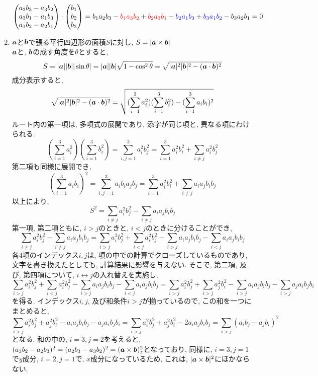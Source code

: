 \documentclass{jsarticle}
\newcommand*{\mbold}[1]{\mbox{\boldmath $#1$}}
\begin{document}
\begin{enumerate}
\[    \]
    \[
      \begin{pmatrix}
        a_2 b_3 - a_3 b_2 \\
        a_3 b_1 - a_1 b_3 \\
        a_1 b_2 - a_2 b_1
      \end{pmatrix}
      \cdot
      \begin{pmatrix}
        b_1 \\
        b_2 \\
        b_3
      \end{pmatrix}
      = b_1 a_2 b_3 - \textcolor{red}{b_1 a_3 b_2}
      + \textcolor{red}{b_2 a_3 b_1} - \textcolor{blue}{b_2 a_1 b_3}
      + \textcolor{blue}{b_3 a_1 b_2} - b_3 a_2 b_1 = 0 
    \]
  \item $\mbold{a}$と$\mbold{b}$で張る平行四辺形の面積$S$に対し, $S = |\mbold{a} \times \mbold{b}|$ \\
    $\mbold{a}$と, $\mbold{b}$の成す角度を$\theta$とすると, 
    \[
      S = |\mbold{a}||\mbold{b}||\sin\theta|
      = |\mbold{a}||\mbold{b}|\sqrt{1 - \cos^2\theta}
      = \sqrt{|\mbold{a}|^2 |\mbold{b}|^2 - (\mbold{a}\cdot\mbold{b})^2}
    \]
    成分表示すると, 
    \[
      \sqrt{|\mbold{a}|^2 |\mbold{b}|^2 - (\mbold{a}\cdot\mbold{b})^2}
      = \sqrt{(\sum_{i = 1}^{3} a_i^2) (\sum_{i = 1}^{3} b_i^2) - (\sum_{i = 1}^{3} a_i b_i)^2}
    \]
    ルート内の第一項は, 多項式の展開であり, 添字が同じ項と, 異なる項にわけられる. 
    \[
      (\sum_{i = 1}^{3} a_i^2) (\sum_{i = 1}^{3} b_i^2) = \sum_{i,j=1}^{3}a_i^2 b_j^2 = \sum_{i = 1}^{3}a_i^2 b_i^2 + \sum_{i \neq j}a_i^2 b_j^2
    \]
    第二項も同様に展開でき, 
    \[
      (\sum_{i = 1}^{3} a_i b_i)^2 = \sum_{i,j = 1}^{3}a_i b_i a_j b_j = \sum_{i = 1}^{3}a_i^2 b_i^2 + \sum_{i\neq j}a_i a_j b_i b_j
    \]
    以上により, 
    \[
      S^2 = \sum_{i \neq j}a_i^2 b_j^2 - \sum_{i \neq j}a_i a_j b_i b_j
    \]
    第一項, 第二項ともに, $i > j$のときと, $i < j$のときに分けることができ, 
    \[
      \sum_{i \neq j}a_i^2 b_j^2 - \sum_{i \neq j}a_i a_j b_i b_j
      = \sum_{i > j}a_i^2 b_j^2 + \sum_{i < j}a_i^2 b_j^2 - \sum_{i > j}a_i a_j b_i b_j - \sum_{i < j}a_i a_j b_i b_j
    \]
    各4項のインデックス$i, j$は, 項の中での計算でクローズしているものであり, 文字を書き換えたとしても, 計算結果に影響を与えない. そこで, 第二項, 及び, 第四項について, $i \leftrightarrow j$の入れ替えを実施し, 
    \[
      \sum_{i > j}a_i^2 b_j^2 + \sum_{i < j}a_i^2 b_j^2 - \sum_{i > j}a_i a_j b_i b_j - \sum_{i < j}a_i a_j b_i b_j
      = \sum_{i > j}a_i^2 b_j^2 + \sum_{i > j}a_j^2 b_i^2 - \sum_{i > j}a_i a_j b_i b_j - \sum_{i > j}a_j a_i b_j b_i
    \]
    を得る. インデックス$i, j$, 及び和条件$i > j$が揃っているので, この和を一つにまとめると, 
    \[
      \sum_{i > j}a_i^2 b_j^2 + a_j^2 b_i^2 - a_i a_j b_i b_j - a_j a_i b_j b_i = \sum_{i > j}a_i^2 b_j^2 + a_j^2 b_i^2 - 2 a_i a_j b_i b_j = \sum_{i > j}(a_i b_j - a_j b_i)^2
    \]
    となる. 
    和の中の, $i = 3, j = 2$を考えると, $(a_3 b_2 - a_2 b_3)^2 = (a_2 b_3 - a_3 b_2)^2 = (\mbold{a} \times \mbold{b})_z^2$となっており, 同様に, $i = 3, j = 1$で$y$成分, $i = 2, j = 1$で, $x$成分になっているため, これは, $|\mbold{a} \times \mbold{b}|^2$にほかならない. 


\end{enumerate}
\end{document}
